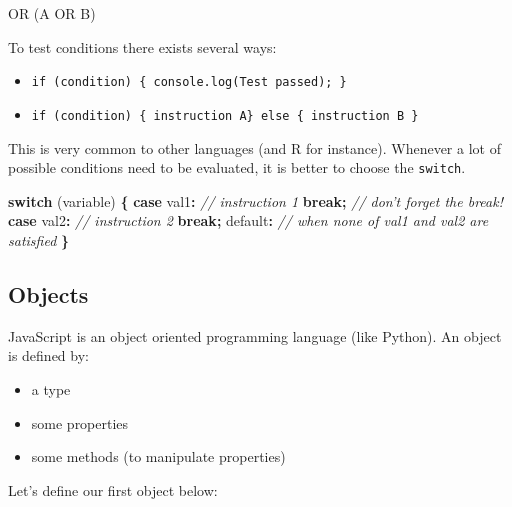 \documentclass[]{book}
\newenvironment{Shaded}{\begin{snugshade}}{\end{snugshade}}
\newcommand{\CommentTok}[1]{\textcolor[rgb]{0.56,0.35,0.01}{\textit{#1}}}
\newcommand{\ControlFlowTok}[1]{\textcolor[rgb]{0.13,0.29,0.53}{\textbf{#1}}}
\newcommand{\DataTypeTok}[1]{\textcolor[rgb]{0.13,0.29,0.53}{#1}}
\newcommand{\NormalTok}[1]{#1}
\newcommand{\OperatorTok}[1]{\textcolor[rgb]{0.81,0.36,0.00}{\textbf{#1}}}
\providecommand{\tightlist}{%
  \setlength{\itemsep}{0pt}\setlength{\parskip}{0pt}}
\begin{document}
OR (A OR B)

To test conditions there exists several ways:

\begin{itemize}
\tightlist
\item
  \texttt{if\ (condition)\ \{\ console.log(\textquotesingle{}Test\ passed\textquotesingle{});\ \}}
\item
  \texttt{if\ (condition)\ \{\ instruction\ A\}\ else\ \{\ instruction\ B\ \}}
\end{itemize}

This is very common to other languages (and R for instance). Whenever a lot of possible conditions need to be evaluated, it is better to choose the \texttt{switch}.

\begin{Shaded}
\begin{Highlighting}[]
\ControlFlowTok{switch}\NormalTok{ (variable) }\OperatorTok{\{}
  \ControlFlowTok{case} \DataTypeTok{val1}\OperatorTok{:} \CommentTok{// instruction 1}
  \ControlFlowTok{break}\OperatorTok{;} \CommentTok{// don't forget the break!}
  \ControlFlowTok{case} \DataTypeTok{val2}\OperatorTok{:}  \CommentTok{// instruction 2}
  \ControlFlowTok{break}\OperatorTok{;}
  \DataTypeTok{default}\OperatorTok{:} \CommentTok{// when none of val1 and val2 are satisfied}
\OperatorTok{\}}
\end{Highlighting}
\end{Shaded}

\hypertarget{objects}{%
\subsection{Objects}\label{objects}}

JavaScript is an object oriented programming language (like Python). An object is defined by:

\begin{itemize}
\tightlist
\item
  a type
\item
  some properties
\item
  some methods (to manipulate properties)
\end{itemize}

Let's define our first object below:
\end{document}
